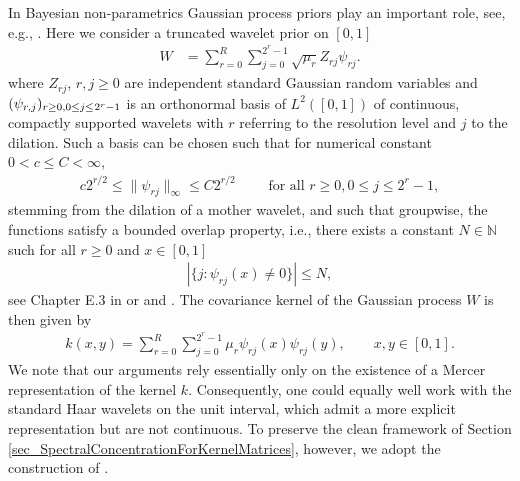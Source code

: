 \documentclass[a4paper,11pt]{article} %
\numberwithin{equation}{section}
\theoremstyle{definition}
\theoremstyle{remark}
\theoremstyle{plain}
\begin{document}
In Bayesian non-parametrics Gaussian process priors play an important role, see, e.g., \citet{GhosalvdVaart2017FundamentalsOfBayes}.
Here we consider a truncated wavelet prior on $[0,1]$
\begin{align}
  \label{eq_Expls_WaveletPrior}
  W & = \sum_{r = 0}^{R} 
           \sum_{j = 0}^{2^{r} - 1} \sqrt{\mu_{r}} Z_{rj} \psi_{rj}.
\end{align}
where \( Z_{r j}  \), \( r, j \ge 0 \) are independent standard Gaussian random variables and \( (\psi_{r, j})_{r \ge 0, 0 \le j \le} \\ _{2^{r} - 1} \) is an orthonormal basis of \( L^{2}([0, 1]) \) of continuous, compactly supported wavelets with \( r \) referring to the resolution level and \( j \) to the dilation.
Such a basis can be chosen such that for numerical constant \( 0 < c \le C < \infty \), 
\begin{align}
  c 2^{r / 2} \le \| \psi_{r j} \|_{\infty} \le C 2^{r/2}
  \qquad \text{ for all } r \ge 0, 0 \le j \le 2^{r} - 1, 
\end{align}
stemming from the  dilation of a mother wavelet, and such that groupwise, the functions satisfy a bounded overlap property, i.e., there exists a constant \( N \in \mathbb{N} \) such for all \( r \ge 0 \) and \( x \in [0, 1] \)
\begin{align}
  \label{eq_Expls_BoundedOverlap}
  | \{ j: \psi_{r j}(x) \ne 0  \}| \le N,
\end{align}
see Chapter E.3 in \cite{GhosalvdVaart2017FundamentalsOfBayes} or \cite{CohenEtal1993WaveletsOnTheInterval} and \cite{GineNickl2016Foundations}.
The covariance kernel of the Gaussian process \( W \) is then given by
\begin{align}
  k(x, y) = \sum_{r = 0}^{R} \sum_{j = 0}^{2^{r} - 1} \mu_{r} \psi_{r j}(x) \psi_{r j}(y), 
  \qquad x, y \in [0, 1].
\end{align}
We note that our arguments rely essentially only on the existence of a Mercer representation of the kernel \( k \).
Consequently, one could equally well work with the standard Haar wavelets on the unit interval, which admit a more explicit representation but are not continuous. 
To preserve the clean framework of Section \ref{sec_SpectralConcentrationForKernelMatrices}, however, we adopt the construction of \cite{CohenEtal1993WaveletsOnTheInterval}.
\end{document}

